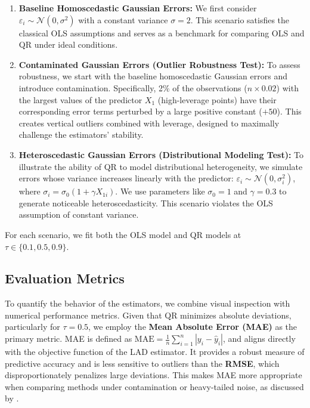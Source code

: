 \documentclass[fleqn,10pt]{latex/stylish_article} %
\begin{document}
\begin{enumerate}
\def\labelenumi{\arabic{enumi}.}
\item
  \textbf{Baseline Homoscedastic Gaussian Errors:} We first consider \(\varepsilon_i \sim \mathcal{N}(0, \sigma^2)\) with a constant variance \(\sigma = 2\). This scenario satisfies the classical OLS assumptions and serves as a benchmark for comparing OLS and QR under ideal conditions.
\item
  \textbf{Contaminated Gaussian Errors (Outlier Robustness Test):} To assess robustness, we start with the baseline homoscedastic Gaussian errors and introduce contamination. Specifically, 2\% of the observations (\(n \times 0.02\)) with the largest values of the predictor \(X_1\) (high-leverage points) have their corresponding error terms perturbed by a large positive constant (\(+50\)). This creates vertical outliers combined with leverage, designed to maximally challenge the estimators' stability.
\item
  \textbf{Heteroscedastic Gaussian Errors (Distributional Modeling Test):} To illustrate the ability of QR to model distributional heterogeneity, we simulate errors whose variance increases linearly with the predictor: \(\varepsilon_i \sim \mathcal{N}(0, \sigma_i^2)\), where \(\sigma_i = \sigma_0 (1 + \gamma X_{1i})\). We use parameters like \(\sigma_0 = 1\) and \(\gamma = 0.3\) to generate noticeable heteroscedasticity. This scenario violates the OLS assumption of constant variance.
\end{enumerate}

For each scenario, we fit both the OLS model and QR models at \(\tau \in \{0.1, 0.5, 0.9\}\).

\subsection{Evaluation Metrics}\label{evaluation-metrics}

To quantify the behavior of the estimators, we combine visual inspection with numerical performance metrics. Given that QR minimizes absolute deviations, particularly for \(\tau = 0.5\), we employ the \textbf{Mean Absolute Error (MAE)} as the primary metric. MAE is defined as \(\text{MAE} = \frac{1}{n} \sum_{i=1}^n |y_i - \hat{y}_i|\), and aligns directly with the objective function of the LAD estimator. It provides a robust measure of predictive accuracy and is less sensitive to outliers than the \textbf{RMSE}, which disproportionately penalizes large deviations. This makes MAE more appropriate when comparing methods under contamination or heavy-tailed noise, as discussed by \citet{Koenker2005}.
\end{document}
